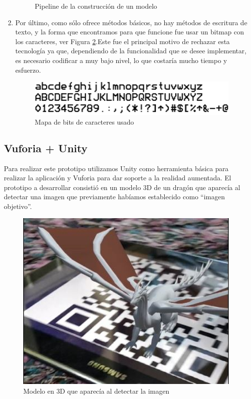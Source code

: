 \begin{enumerate}
\begin{figure}
        \caption{Pipeline de la construcción de un modelo\cite{pipelineopengl}}
        \label{fig:pipeline}
    \end{figure}
    \item Por último, como sólo ofrece métodos básicos, no hay métodos de escritura de texto, y la forma que 
    encontramos para que funcione fue usar un bitmap con los caracteres, ver Figura \ref{fig:mapaBits}.Este fue el principal 
    motivo de rechazar esta tecnología ya que, dependiendo de la funcionalidad que se desee implementar, es necesario codificar a muy bajo nivel, lo que costaría mucho tiempo y esfuerzo.
    \begin{figure}
        \centering
        \includegraphics[width=5in]{figures/bitmap-font.png}
        \caption{Mapa de bits de caracteres usado}
        \label{fig:mapaBits}
    \end{figure}
\end{enumerate}

\subsection{Vuforia + Unity} 
\label{makereference4.1.4}

    Para realizar este prototipo utilizamos Unity como herramienta básica para realizar la aplicación y Vuforia para dar soporte a la realidad aumentada.
    El prototipo a desarrollar consistió en un modelo 3D de un dragón que aparecía al detectar una imagen que previamente habíamos establecido como ``imagen objetivo''.

    \begin{figure}[H]
        \centering
        \includegraphics[width=5in]{figures/prototipoUnity.jpg}
        \caption{Modelo en 3D que aparecía al detectar la imagen}
    \end{figure}

